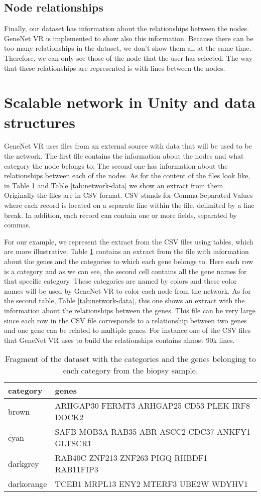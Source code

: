 \subsection{Node relationships}
Finally, our dataset has information about the relationships between the nodes. GeneNet VR is implemented to show also this information. Because there can be too many relationships in the dataset, we don't show them all at the same time. Therefore, we can only see those of the node that the user has selected. The way that these relationships are represented is with lines between the nodes.


\section{Scalable network in Unity and data structures}
GeneNet VR uses files from an external source with data that will be used to be the network. The first file contains the information about the nodes and what category the node belongs to; The second one has information about the relationships between each of the nodes. As for the content of the files look like, in Table \ref{tab:categories-data} and Table \ref{tab:network-data} we show an extract from them. Originally the files are in CSV format. CSV \cite{csv} stands for Comma-Separated Values where each record is located on a separate line within the file, delimited by a line break. In addition, each record can contain one or more fields, separated by commas.

For our example, we represent the extract from the CSV files using tables, which are more illustrative. Table \ref{tab:categories-data} contains an extract from the file with information about the genes and the categories to which each gene belongs to. Here each row is a category and as we can see, the second cell contains all the gene names for that specific category. These categories are named by colors and these color names will be used by GeneNet VR to color each node from the network. As for the second table, Table \ref{tab:network-data}, this one shows an extract with the information about the relationships between the genes. This file can be very large since each row in the CSV file corresponds to a relationship between two genes and one gene can be related to multiple genes. For instance one of the CSV files that GeneNet VR uses to build the relationships contains almost 90k lines.

\begin{table}[h!]
\centering
\begin{tabular}{ll}
\hline
category & genes          \\
\hline
brown   & ARHGAP30 FERMT3 ARHGAP25 CD53 PLEK IRF8 DOCK2\\
cyan  & SAFB MOB3A RAB35 ABR ASCC2 CDC37 ANKFY1 GLTSCR1\\
darkgrey  & RAB40C ZNF213 ZNF263 PIGQ RHBDF1 RAB11FIP3\\
darkorange  & TCEB1 MRPL13 ENY2 MTERF3 UBE2W WDYHV1\\
\end{tabular}
\caption{Fragment of the dataset with the categories and the genes belonging to each category from the biopsy sample.}
\label{tab:categories-data}
\end{table}

